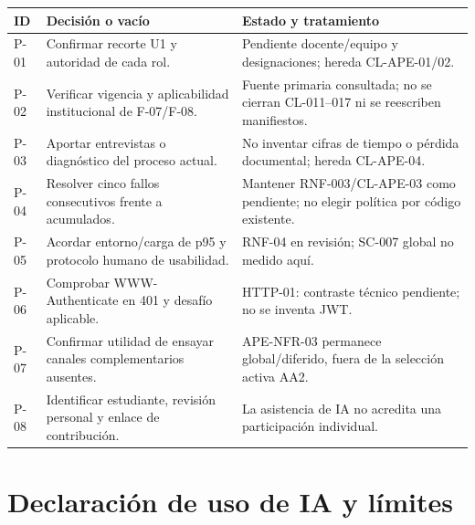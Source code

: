 \documentclass[12pt,a4paper]{report}
\begin{document}
{\def\LTcaptype{none} %
\begin{longtable}[]{@{}
  >{\raggedright\arraybackslash}p{}
  >{\raggedright\arraybackslash}p{}
  >{\raggedright\arraybackslash}p{}@{}}
\toprule\noalign{}
\begin{minipage}[b]{\linewidth}\raggedright
ID
\end{minipage} & \begin{minipage}[b]{\linewidth}\raggedright
Decisión o vacío
\end{minipage} & \begin{minipage}[b]{\linewidth}\raggedright
Estado y tratamiento
\end{minipage} \\
\midrule\noalign{}
\endhead
\bottomrule\noalign{}
\endlastfoot
P-01 & Confirmar recorte U1 y autoridad de cada rol. & Pendiente
docente/equipo y designaciones; hereda CL-APE-01/02. \\
P-02 & Verificar vigencia y aplicabilidad institucional de F-07/F-08.
& Fuente primaria consultada; no se cierran CL-011--017 ni se reescriben
manifiestos. \\
P-03 & Aportar entrevistas o diagnóstico del proceso actual. & No
inventar cifras de tiempo o pérdida documental; hereda CL-APE-04. \\
P-04 & Resolver cinco fallos consecutivos frente a acumulados. &
Mantener RNF-003/CL-APE-03 como pendiente; no elegir política por código
existente. \\
P-05 & Acordar entorno/carga de p95 y protocolo humano de usabilidad.
& RNF-04 en revisión; SC-007 global no medido aquí. \\
P-06 & Comprobar WWW-Authenticate en 401 y desafío aplicable. &
HTTP-01: contraste técnico pendiente; no se inventa JWT. \\
P-07 & Confirmar utilidad de ensayar canales complementarios
ausentes. & APE-NFR-03 permanece global/diferido, fuera de la selección
activa AA2. \\
P-08 & Identificar estudiante, revisión personal y enlace de
contribución. & La asistencia de IA no acredita una participación
individual. \\
\end{longtable}
}

\section{Declaración de uso de IA y
límites}\label{dossier-declaraciuxf3n-de-uso-de-ia-y-luxedmites}
\end{document}
